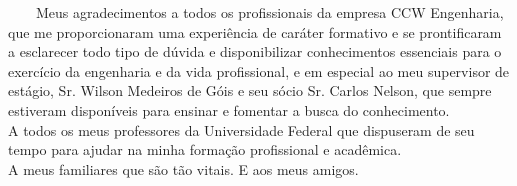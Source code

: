 \ \ \ \ Meus agradecimentos a todos os profissionais da empresa CCW Engenharia, que me proporcionaram 
uma experiência de caráter formativo  e se prontificaram a esclarecer todo tipo de dúvida e disponibilizar conhecimentos essenciais para o exercício da engenharia e da vida profissional, e em especial ao meu supervisor de estágio, Sr. Wilson Medeiros de Góis e seu sócio Sr. Carlos Nelson, que sempre estiveram disponíveis para ensinar e fomentar a busca do conhecimento.\\





A todos os meus professores da Universidade Federal que dispuseram de seu tempo para ajudar na minha formação profissional e acadêmica.\\




A meus familiares que são tão vitais. E aos meus amigos.\\


